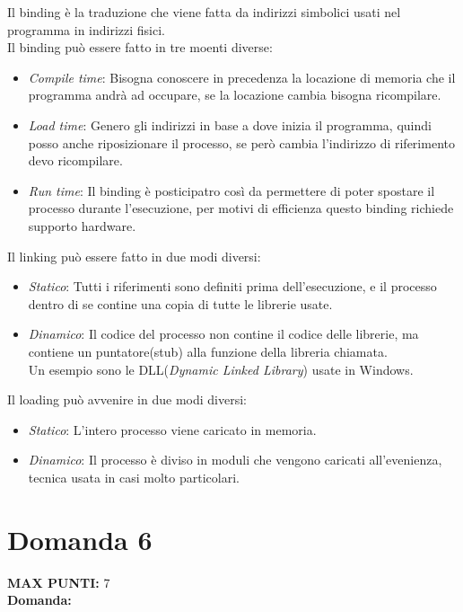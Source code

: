 \documentclass{article}
\begin{document}
    Il binding è la traduzione che viene fatta da indirizzi simbolici usati nel programma in indirizzi fisici.\\
    Il binding può essere fatto in tre moenti diverse:
    \begin{itemize}
        \item \emph{Compile time}: Bisogna conoscere in precedenza la locazione di memoria che il programma andrà ad occupare, se la locazione cambia bisogna ricompilare.
        \item \emph{Load time}: Genero gli indirizzi in base a dove inizia il programma, quindi posso anche riposizionare il processo, se però cambia l'indirizzo di riferimento devo ricompilare.
        \item \emph{Run time}: Il binding è posticipatro così da permettere di poter spostare il processo durante l'esecuzione, per motivi di efficienza questo binding richiede supporto hardware.
    \end{itemize}
    Il linking può essere fatto in due modi diversi:
    \begin{itemize}
        \item \emph{Statico}: Tutti i riferimenti sono definiti prima dell'esecuzione, e il processo dentro di se contine una copia di tutte le librerie usate.
        \item \emph{Dinamico}: Il codice del processo non contine il codice delle librerie, ma contiene un puntatore(stub) alla funzione della libreria chiamata.\\
        Un esempio sono le DLL(\emph{Dynamic Linked Library}) usate in Windows.
    \end{itemize}
    Il loading può avvenire in due modi diversi:
    \begin{itemize}
        \item \emph{Statico}: L'intero processo viene caricato in memoria.
        \item \emph{Dinamico}: Il processo è diviso in moduli che vengono caricati all'evenienza, tecnica usata in casi molto particolari.
    \end{itemize}
    \section*{Domanda 6}
    \textbf{MAX PUNTI:} 7\\
    \textbf{Domanda:}
\end{document}
